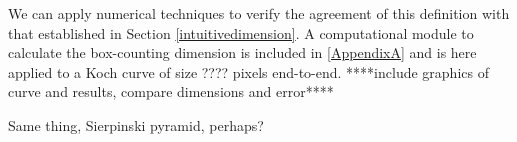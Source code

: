 \begin{myexample}We can apply numerical techniques to verify the agreement of this definition with that established in Section \ref{intuitivedimension}. A computational module to calculate the box-counting dimension is included in \ref{AppendixA} and is here applied to a Koch curve of size ???? pixels end-to-end. ****include graphics of curve and results, compare dimensions and error****  \end{myexample}

\begin{myexample}Same thing, Sierpinski pyramid, perhaps?\end{myexample}


\listoftodos






































